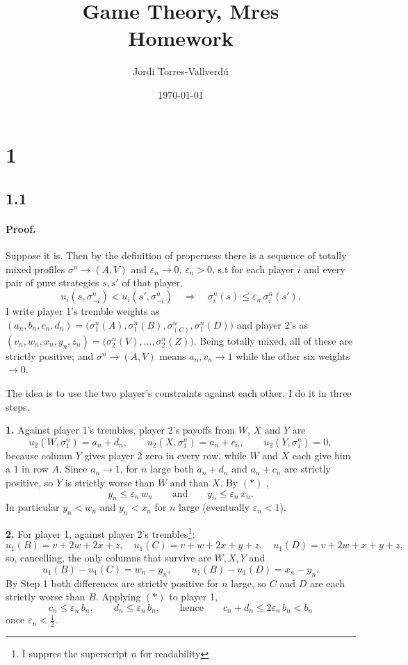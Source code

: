\documentclass[12pt]{article}
\title{Game Theory, Mres\\Homework}
\author{Jordi Torres-Vallverdú}
\date{\today}
\begin{document}
\maketitle

\section*{1}
\subsection*{1.1}
\paragraph{Proof.}
Suppose it is. Then by the definition of properness there is a sequence of totally mixed profiles $\sigma^n \to (A,V)$ and  $\varepsilon_n \to 0$, $\varepsilon_n > 0$, s.t for each player $i$ and every pair of pure strategies $s,s'$ of that player,
\begin{equation}\tag{$\ast$}
u_i(s,\sigma^n_{-i}) < u_i(s',\sigma^n_{-i})
\quad\Longrightarrow\quad
\sigma^n_i(s) \le \varepsilon_n\,\sigma^n_i(s').
\end{equation}
I  write player 1's tremble weights as
$(a_n,b_n,c_n,d_n) = \big(\sigma^n_1(A),\sigma^n_1(B),\sigma^n_(C),\sigma^n_1(D)\big)$
and player 2's as
$(v_n,w_n,x_n,y_n,z_n) = \big(\sigma^n_2(V),\dots,\sigma^n_2(Z)\big)$.
Being totally mixed, all of these are strictly positive; and
$\sigma^n \to (A,V)$ means $a_n,v_n \to 1$ while the other six weights
$\to 0$.
 
The idea is to use the two player's constraints against each other. I do it in three steps.
 
\medskip
\textbf{1.}
Against player 1's trembles, player 2's payoffs from $W$, $X$ and $Y$ are
\[
u_2(W,\sigma^n_1) = a_n + d_n,\qquad
u_2(X,\sigma^n_1) = a_n + c_n,\qquad
u_2(Y,\sigma^n_1) = 0,
\]
because column $Y$ gives player 2 zero in every row, while $W$ and $X$ each give him a $1$ in row $A$. Since $a_n \to 1$, for $n$ large both $a_n+d_n$ and $a_n+c_n$ are strictly positive, so $Y$ is strictly worse than $W$ and than $X$. By $(\ast)$ ,
\[
y_n \le \varepsilon_n\, w_n
\qquad\text{and}\qquad
y_n \le \varepsilon_n\, x_n .
\]
In particular $y_n < w_n$ and $y_n < x_n$ for $n$ large (eventually $\varepsilon_n < 1$).
 
\textbf{2.}
For player 1, against player 2's trembles\footnote{I suppres the superscript $n$ for
readability}:
\[
u_1(B) = v+2w+2x+z,\quad
u_1(C) = v+w+2x+y+z,\quad
u_1(D) = v+2w+x+y+z,
\]
so, cancelling, the only columns that survive are $W,X,Y$ and
\[
u_1(B) - u_1(C) = w_n - y_n,\qquad
u_1(B) - u_1(D) = x_n - y_n .
\]
By Step 1 both differences are strictly positive for $n$ large, so $C$ and $D$ are each strictly worse than $B$. Applying $(\ast)$ to player 1,
\[
c_n \le \varepsilon_n\, b_n,\qquad
d_n \le \varepsilon_n\, b_n,
\qquad\text{hence}\qquad
c_n + d_n \le 2\varepsilon_n\, b_n < b_n
\]
once $\varepsilon_n < \tfrac12$.
\end{document}

